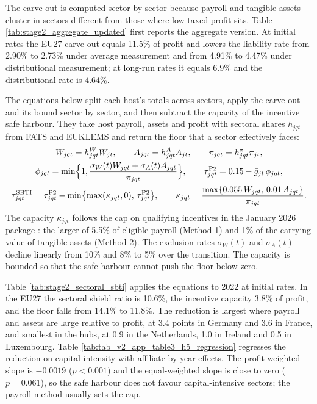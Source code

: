 \documentclass[11pt,a4paper]{article}
\begin{document}
The carve-out is computed sector by sector because payroll and tangible assets cluster in sectors different from those where low-taxed profit sits. Table \ref{tab:stage2_aggregate_updated} first reports the aggregate version. At initial rates the EU27 carve-out equals 11.5\% of profit and lowers the liability rate from 2.90\% to 2.73\% under average measurement and from 4.91\% to 4.47\% under distributional measurement; at long-run rates it equals 6.9\% and the distributional rate is 4.64\%.



The equations below split each host's totals across sectors, apply the carve-out and its bound sector by sector, and then subtract the capacity of the incentive safe harbour. They take host payroll, assets and profit with sectoral shares $h_{jqt}$ from FATS and EUKLEMS and return the floor that a sector effectively faces:
\begin{gather}
W_{jqt}=h^{W}_{jqt}W_{jt},\qquad A_{jqt}=h^{A}_{jqt}A_{jt},\qquad \pi_{jqt}=h^{\pi}_{jqt}\pi_{jt},\label{eq:app_sector_split}\\
\phi_{jqt}=\min\Bigl\{1,\frac{\sigma_W(t)W_{jqt}+\sigma_A(t)A_{jqt}}{\pi_{jqt}}\Bigr\},\qquad
\tau^{\mathrm{P2}}_{jqt}=0.15-\bar g_{jt}\,\phi_{jqt},\label{eq:app_sector_floor}\\
\tau^{\mathrm{SBTI}}_{jqt}=\tau^{\mathrm{P2}}_{jqt}-\min\bigl\{\max(\kappa_{jqt},0),\,\tau^{\mathrm{P2}}_{jqt}\bigr\},\qquad
\kappa_{jqt}=\frac{\max\{0.055\,W_{jqt},\,0.01\,A_{jqt}\}}{\pi_{jqt}}.\label{eq:app_sbti}
\end{gather}
The capacity $\kappa_{jqt}$ follows the cap on qualifying incentives in the January 2026 package \citep{oecd2026}: the larger of 5.5\% of eligible payroll (Method 1) and 1\% of the carrying value of tangible assets (Method 2). The exclusion rates $\sigma_W(t)$ and $\sigma_A(t)$ decline linearly from 10\% and 8\% to 5\% over the transition. The capacity is bounded so that the safe harbour cannot push the floor below zero.



Table \ref{tab:stage2_sectoral_sbti} applies the equations to 2022 at initial rates. In the EU27 the sectoral shield ratio is 10.6\%, the incentive capacity 3.8\% of profit, and the floor falls from 14.1\% to 11.8\%. The reduction is largest where payroll and assets are large relative to profit, at 3.4 points in Germany and 3.6 in France, and smallest in the hubs, at 0.9 in the Netherlands, 1.0 in Ireland and 0.5 in Luxembourg. Table \ref{tab:tab_v2_app_table3_h5_regression} regresses the reduction on capital intensity with affiliate-by-year effects. The profit-weighted slope is $-0.0019$ ($p<0.001$) and the equal-weighted slope is close to zero ($p=0.061$), so the safe harbour does not favour capital-intensive sectors; the payroll method usually sets the cap.
\end{document}
